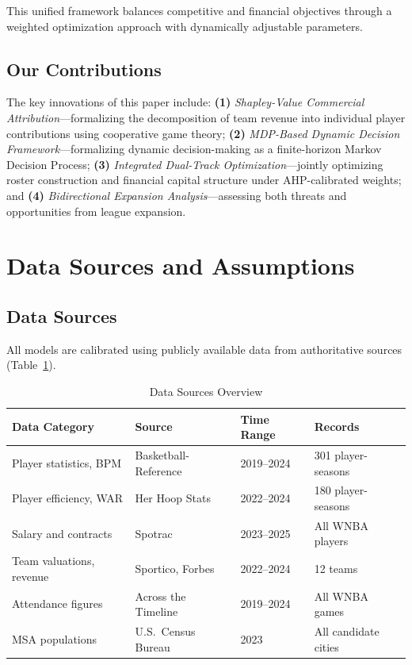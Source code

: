 \documentclass{mcmthesis}
\begin{document}
This unified framework balances competitive and financial objectives through a weighted optimization approach with dynamically adjustable parameters.

\subsection{Our Contributions}
The key innovations of this paper include: \textbf{(1)} \textit{Shapley-Value Commercial Attribution}---formalizing the decomposition of team revenue into individual player contributions using cooperative game theory; \textbf{(2)} \textit{MDP-Based Dynamic Decision Framework}---formalizing dynamic decision-making as a finite-horizon Markov Decision Process; \textbf{(3)} \textit{Integrated Dual-Track Optimization}---jointly optimizing roster construction and financial capital structure under AHP-calibrated weights; and \textbf{(4)} \textit{Bidirectional Expansion Analysis}---assessing both threats and opportunities from league expansion.


\section{Data Sources and Assumptions}

\subsection{Data Sources}
All models are calibrated using publicly available data from authoritative sources (Table~\ref{tab:data}).

\begin{table}[H]
\centering
\caption{Data Sources Overview}
\label{tab:data}
\small
\begin{tabular}{p{4cm}p{4.2cm}p{2.2cm}p{4cm}}
\toprule
\textbf{Data Category} & \textbf{Source} & \textbf{Time Range} & \textbf{Records} \\
\midrule
Player statistics, BPM & Basketball-Reference \cite{bbref2024} & 2019--2024 & 301 player-seasons \\
Player efficiency, WAR & Her Hoop Stats \cite{herhoops2024} & 2022--2024 & 180 player-seasons \\
Salary and contracts & Spotrac \cite{spotrac2024} & 2023--2025 & All WNBA players \\
Team valuations, revenue & Sportico, Forbes \cite{sportico2024fever, forbes2024wnba} & 2022--2024 & 12 teams \\
Attendance figures & Across the Timeline \cite{att2024} & 2019--2024 & All WNBA games \\
MSA populations & U.S.\ Census Bureau \cite{census2024} & 2023 & All candidate cities \\
\bottomrule
\end{tabular}
\end{table}
\end{document}
